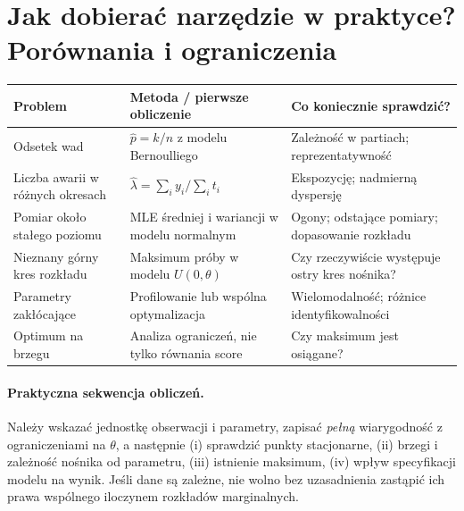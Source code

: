 \documentclass[11pt,a4paper,oneside]{report}
\numberwithin{equation}{chapter}
\theoremstyle{plain}
\theoremstyle{definition}
\theoremstyle{remark}
\begin{document}
\section{Jak dobierać narzędzie w praktyce? Porównania i ograniczenia}
\begin{center}\small
\begin{tabular}{>{\raggedright\arraybackslash}p{}>{\raggedright\arraybackslash}p{}>{\raggedright\arraybackslash}p{}}
\toprule
\textbf{Problem} & \textbf{Metoda / pierwsze obliczenie} & \textbf{Co koniecznie sprawdzić?}\\
\midrule
Odsetek wad & $\widehat p=k/n$ z modelu Bernoulliego & Zależność w partiach; reprezentatywność\\
Liczba awarii w różnych okresach & $\widehat\lambda=\sum_i y_i/\sum_i t_i$ & Ekspozycję; nadmierną dyspersję\\
Pomiar około stałego poziomu & MLE średniej i wariancji w modelu normalnym & Ogony; odstające pomiary; dopasowanie rozkładu\\
Nieznany górny kres rozkładu & Maksimum próby w modelu $U(0,\theta)$ & Czy rzeczywiście występuje ostry kres nośnika?\\
Parametry zakłócające & Profilowanie lub wspólna optymalizacja & Wielomodalność; różnice identyfikowalności\\
Optimum na brzegu & Analiza ograniczeń, nie tylko równania score & Czy maksimum jest osiągane?\\
\bottomrule
\end{tabular}
\end{center}

\paragraph{Praktyczna sekwencja obliczeń.}
Należy wskazać jednostkę obserwacji i parametry, zapisać \emph{pełną}
wiarygodność z ograniczeniami na $\theta$, a następnie (i) sprawdzić
punkty stacjonarne, (ii) brzegi i zależność nośnika od parametru,
(iii) istnienie maksimum, (iv) wpływ specyfikacji modelu na wynik.
Jeśli dane są zależne, nie wolno bez uzasadnienia zastąpić ich prawa
wspólnego iloczynem rozkładów marginalnych.
\end{document}
